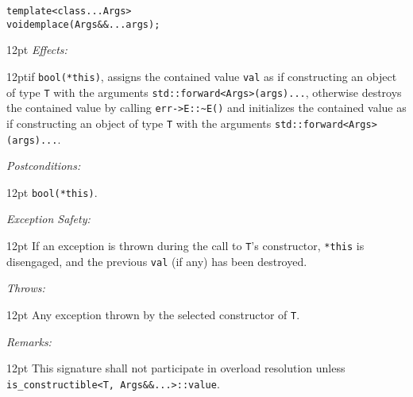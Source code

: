 \documentclass[a4paper,10pt]{article}
\newcommand{\cpp}[1]{\lstinline{#1}}
\newcommand{\wordingItem}[1]{\noindent\textit{#1:}}
\newenvironment{wordingTextItem}[1]{\wordingItem{#1}\vspace{2pt}\noindent\begin{adjustwidth}{12pt}{}}{\vspace{2pt}\end{adjustwidth}}
\newenvironment{wordingPara}{\begin{adjustwidth}{12pt}{}}{\end{adjustwidth}}
\begin{document}
\begin{alltt}
template <class... Args>
void emplace(Args&&... args); 
\end{alltt}
\begin{wordingPara}
\begin{wordingTextItem}{Effects}if \cpp{bool(*this)}, assigns the contained value \cpp{val} as if constructing an object of type \cpp{T} with the arguments \cpp{std::forward<Args>(args)...}, otherwise destroys the contained value by calling \cpp{err->E::~E()} and  initializes the contained value as if constructing an object of type \cpp{T} with the arguments \cpp{std::forward<Args>(args)...}.
\end{wordingTextItem}
\begin{wordingTextItem}{Postconditions}
\cpp{bool(*this)}.
\end{wordingTextItem}
\begin{wordingTextItem}{Exception Safety}
If an exception is thrown during the call to \cpp{T}'s constructor, \cpp{*this} is disengaged, and the previous \cpp{val} (if any) has been destroyed.
\end{wordingTextItem}
\begin{wordingTextItem}{Throws}
Any exception thrown by the selected constructor of \cpp{T}.
\end{wordingTextItem}
\begin{wordingTextItem}{Remarks}
This signature shall not participate in overload resolution unless\\
\cpp{is_constructible<T, Args&&...>::value}.
\end{wordingTextItem}
\end{wordingPara}
\end{document}
